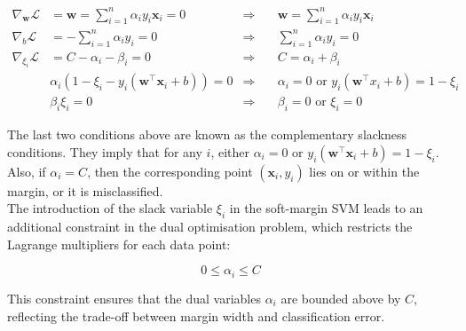 \begin{align*}
\nabla_{\mathbf{w}} \mathcal{L} &=  \mathbf{w} = \sum_{i=1}^n \alpha_i y_i \mathbf{x}_i = 0 \quad &\Rightarrow& \quad \mathbf{w} = \sum_{i=1}^n \alpha_i y_i \mathbf{x}_i\\
\nabla_b \mathcal{L} &= -\sum_{i=1}^n \alpha_i y_i = 0 \quad &\Rightarrow& \quad \sum_{i=1}^n \alpha_i y_i = 0\\
\nabla_{\xi_i} \mathcal{L} &= C - \alpha_i - \beta_i = 0 \quad &\Rightarrow& \quad C = \alpha_i + \beta_i\\
&\alpha_i (1 - \xi_i - y_i(\mathbf{w}^\top \mathbf{x}_i + b)) = 0 &\Rightarrow& \quad \alpha_i = 0\text{ or } y_i(\textbf{w}^\top x_i + b) = 1-\xi_i\\
&\beta_i \xi_i = 0 &\Rightarrow& \quad \beta_i = 0 \text{ or } \xi_i = 0
\end{align*}





The last two conditions above are known as the complementary slackness conditions. They imply that for any \( i \), either \( \alpha_i = 0 \) or \( y_i(\mathbf{w}^\top \mathbf{x}_i + b) = 1 - \xi_i \). Also, if \( \alpha_i = C \), then the corresponding point \( (\mathbf{x}_i, y_i) \) lies on or within the margin, or it is misclassified.\\

The introduction of the slack variable \( \xi_i \) in the soft-margin SVM leads to an additional constraint in the dual optimisation problem, which restricts the Lagrange multipliers for each data point:

\[
0 \leq \alpha_i \leq C
\]

This constraint ensures that the dual variables \( \alpha_i \) are bounded above by \( C \), reflecting the trade-off between margin width and classification error.

